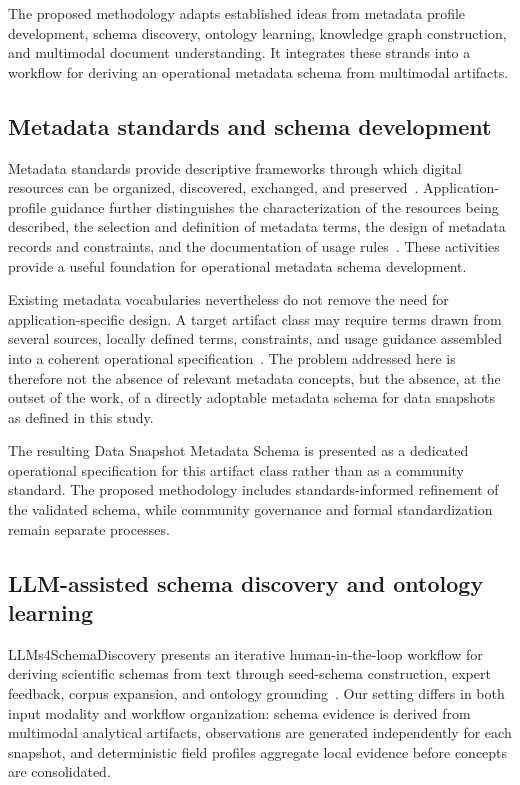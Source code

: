 \documentclass{article}
\begin{document}
The proposed methodology adapts established ideas from metadata profile development, schema discovery, ontology learning, knowledge graph construction, and multimodal document understanding. It integrates these strands into a workflow for deriving an operational metadata schema from multimodal artifacts.

\subsection{Metadata standards and schema development}

Metadata standards provide descriptive frameworks through which digital resources can be organized, discovered, exchanged, and preserved~\citep{gilliland2008}. Application-profile guidance further distinguishes the characterization of the resources being described, the selection and definition of metadata terms, the design of metadata records and constraints, and the documentation of usage rules~\citep{coyle2009applicationprofiles}. These activities provide a useful foundation for operational metadata schema development.

Existing metadata vocabularies nevertheless do not remove the need for application-specific design. A target artifact class may require terms drawn from several sources, locally defined terms, constraints, and usage guidance assembled into a coherent operational specification~\citep{greenberg2005,coyle2009applicationprofiles}. The problem addressed here is therefore not the absence of relevant metadata concepts, but the absence, at the outset of the work, of a directly adoptable metadata schema for data snapshots as defined in this study.

The resulting Data Snapshot Metadata Schema is presented as a dedicated operational specification for this artifact class rather than as a community standard. The proposed methodology includes standards-informed refinement of the validated schema, while community governance and formal standardization remain separate processes.

\subsection{LLM-assisted schema discovery and ontology learning}

LLMs4SchemaDiscovery presents an iterative human-in-the-loop workflow for deriving scientific schemas from text through seed-schema construction, expert feedback, corpus expansion, and ontology grounding~\citep{sadruddin2025schemadiscovery}. Our setting differs in both input modality and workflow organization: schema evidence is derived from multimodal analytical artifacts, observations are generated independently for each snapshot, and deterministic field profiles aggregate local evidence before concepts are consolidated.
\end{document}
